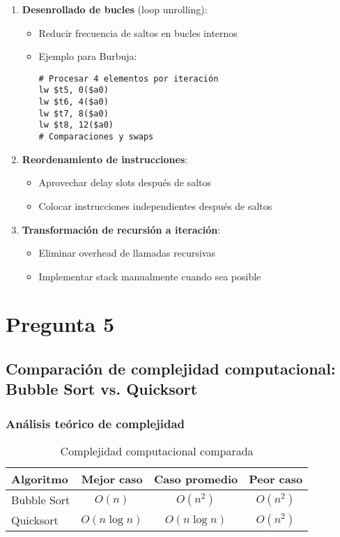 \documentclass{article}
\begin{document}
\begin{enumerate}
    \item \textbf{Desenrollado de bucles} (loop unrolling):
    \begin{itemize}
        \item Reducir frecuencia de saltos en bucles internos
        \item Ejemplo para Burbuja:
\begin{verbatim}
# Procesar 4 elementos por iteración
lw $t5, 0($a0)
lw $t6, 4($a0)
lw $t7, 8($a0)
lw $t8, 12($a0)
# Comparaciones y swaps
\end{verbatim}
    \end{itemize}
    
    \item \textbf{Reordenamiento de instrucciones}:
    \begin{itemize}
        \item Aprovechar delay slots después de saltos
        \item Colocar instrucciones independientes después de saltos
    \end{itemize}
    
    \item \textbf{Transformación de recursión a iteración}:
    \begin{itemize}
        \item Eliminar overhead de llamadas recursivas
        \item Implementar stack manualmente cuando sea posible
    \end{itemize}
\end{enumerate}


\section*{Pregunta 5}

\subsection*{Comparación de complejidad computacional: Bubble Sort vs. Quicksort}

\subsubsection*{Análisis teórico de complejidad}

\begin{table}[h]
\centering
\caption{Complejidad computacional comparada}
\begin{tabular}{|l|c|c|c|}
\hline
\textbf{Algoritmo} & \textbf{Mejor caso} & \textbf{Caso promedio} & \textbf{Peor caso} \\
\hline
Bubble Sort & $O(n)$ & $O(n^2)$ & $O(n^2)$ \\
\hline
Quicksort & $O(n \log n)$ & $O(n \log n)$ & $O(n^2)$ \\
\hline
\end{tabular}
\end{table}
\end{document}
